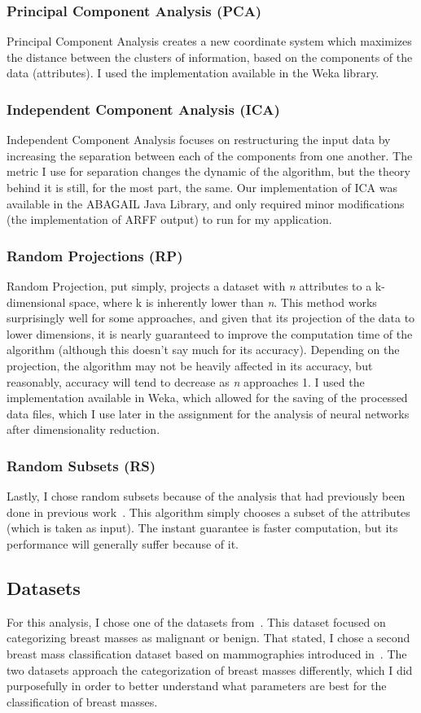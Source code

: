 \documentclass[annual]{acmsiggraph}
\begin{document}
\subsubsection{Principal Component Analysis (PCA)}
Principal Component Analysis creates a new coordinate system which maximizes the distance between the clusters of information, based on the components of the data (attributes). I used the implementation available in the Weka library.
\subsubsection{Independent Component Analysis (ICA)}
Independent Component Analysis focuses on restructuring the input data by increasing the separation between each of the components from one another. The metric I use for separation changes the dynamic of the algorithm, but the theory behind it is still, for the most part, the same. Our implementation of ICA was available in the ABAGAIL Java Library, and only required minor modifications (the implementation of ARFF output) to run for my application.
\subsubsection{Random Projections (RP)}
Random Projection, put simply, projects a dataset with \emph{n} attributes to a k-dimensional space, where k is inherently lower than \emph{n}. This method works surprisingly well for some approaches, and given that its projection of the data to lower dimensions, it is nearly guaranteed to improve the computation time of the algorithm (although this doesn't say much for its accuracy). Depending on the projection, the algorithm may not be heavily affected in its accuracy, but reasonably, accuracy will tend to decrease as \emph{n} approaches 1. I used the implementation available in Weka, which allowed for the saving of the processed data files, which I use later in the assignment for the analysis of neural networks after dimensionality reduction.
\subsubsection{Random Subsets (RS)}
Lastly, I chose random subsets because of the analysis that had previously been done in previous work~\cite{Castro1:2013}. This algorithm simply chooses a subset of the attributes (which is taken as input). The instant guarantee is faster computation, but its performance will generally suffer because of it.
\subsection{Datasets}
For this analysis, I chose one of the datasets from~\cite{Castro1:2013}. This dataset focused on categorizing breast masses as malignant or benign. That stated, I chose a second breast mass classification dataset based on mammographies introduced in~\cite{elter2007prediction}. The two datasets approach the categorization of breast masses differently, which I did purposefully in order to better understand what parameters are best for the classification of breast masses.
\end{document}
